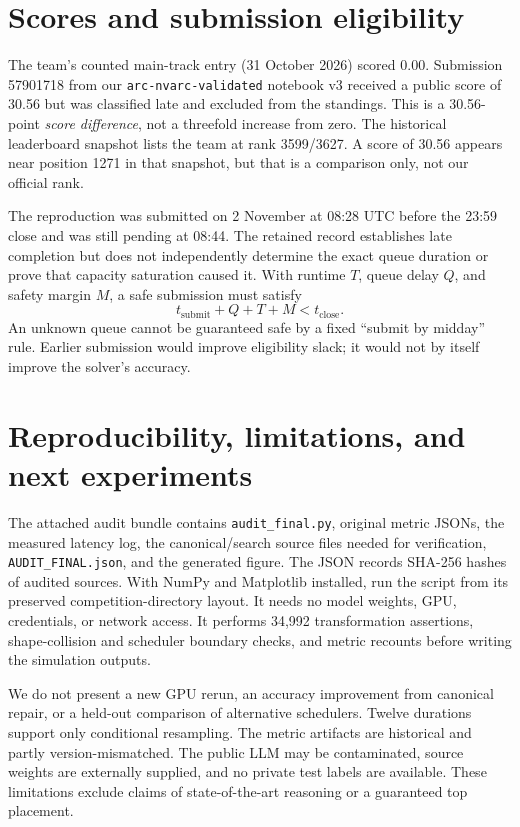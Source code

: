 \documentclass[10pt,a4paper]{article}
\begin{document}
\section{Scores and submission eligibility}
The team's counted main-track entry (31 October 2026) scored 0.00. Submission 57901718 from our \texttt{arc-nvarc-validated} notebook v3 received a public score of 30.56 but was classified late and excluded from the standings. This is a 30.56-point \emph{score difference}, not a threefold increase from zero. The historical leaderboard snapshot lists the team at rank 3599/3627. A score of 30.56 appears near position 1271 in that snapshot, but that is a comparison only, not our official rank.

The reproduction was submitted on 2 November at 08:28 UTC before the 23:59 close and was still pending at 08:44. The retained record establishes late completion but does not independently determine the exact queue duration or prove that capacity saturation caused it. With runtime $T$, queue delay $Q$, and safety margin $M$, a safe submission must satisfy
\[
t_{\mathrm{submit}}+Q+T+M < t_{\mathrm{close}}.
\]
An unknown queue cannot be guaranteed safe by a fixed ``submit by midday'' rule. Earlier submission would improve eligibility slack; it would not by itself improve the solver's accuracy.

\section{Reproducibility, limitations, and next experiments}
The attached audit bundle contains \texttt{audit\_final.py}, original metric JSONs, the measured latency log, the canonical/search source files needed for verification, \texttt{AUDIT\_FINAL.json}, and the generated figure. The JSON records SHA-256 hashes of audited sources. With NumPy and Matplotlib installed, run the script from its preserved competition-directory layout. It needs no model weights, GPU, credentials, or network access. It performs 34,992 transformation assertions, shape-collision and scheduler boundary checks, and metric recounts before writing the simulation outputs.

We do not present a new GPU rerun, an accuracy improvement from canonical repair, or a held-out comparison of alternative schedulers. Twelve durations support only conditional resampling. The metric artifacts are historical and partly version-mismatched. The public LLM may be contaminated, source weights are externally supplied, and no private test labels are available. These limitations exclude claims of state-of-the-art reasoning or a guaranteed top placement.
\end{document}
